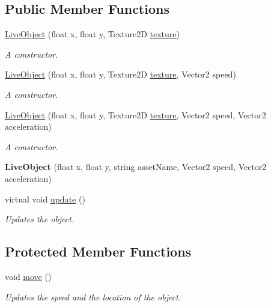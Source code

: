 \subsection*{Public Member Functions}
\begin{DoxyCompactItemize}
\item 
\hyperlink{classwp__engine_1_1_live_object_a9df3b7ad35240319f760c7c02f24f453}{Live\-Object} (float x, float y, Texture2\-D \hyperlink{classwp__engine_1_1_object_a5aebe29df25c51280d462cab63733c98}{texture})
\begin{DoxyCompactList}\small\item\em A constructor. \end{DoxyCompactList}\item 
\hyperlink{classwp__engine_1_1_live_object_a4db779ac4b6c29bee18ad2f006d31c48}{Live\-Object} (float x, float y, Texture2\-D \hyperlink{classwp__engine_1_1_object_a5aebe29df25c51280d462cab63733c98}{texture}, Vector2 speed)
\begin{DoxyCompactList}\small\item\em A constructor. \end{DoxyCompactList}\item 
\hyperlink{classwp__engine_1_1_live_object_a98dd1f4bce092323ebe406f618099246}{Live\-Object} (float x, float y, Texture2\-D \hyperlink{classwp__engine_1_1_object_a5aebe29df25c51280d462cab63733c98}{texture}, Vector2 speed, Vector2 acceleration)
\begin{DoxyCompactList}\small\item\em A constructor. \end{DoxyCompactList}\item 
\hypertarget{classwp__engine_1_1_live_object_a0197e57f604dc1cb9e56440e193990e5}{{\bfseries Live\-Object} (float x, float y, string asset\-Name, Vector2 speed, Vector2 acceleration)}\label{classwp__engine_1_1_live_object_a0197e57f604dc1cb9e56440e193990e5}

\item 
virtual void \hyperlink{classwp__engine_1_1_live_object_af5db9ac2ecb0bc442ce6b43ffb1744b5}{update} ()
\begin{DoxyCompactList}\small\item\em Updates the object. \end{DoxyCompactList}\end{DoxyCompactItemize}
\subsection*{Protected Member Functions}
\begin{DoxyCompactItemize}
\item 
void \hyperlink{classwp__engine_1_1_live_object_a78341f24c3b41df7e8b1770beadce169}{move} ()
\begin{DoxyCompactList}\small\item\em Updates the speed and the location of the object. \end{DoxyCompactList}\end{DoxyCompactItemize}
